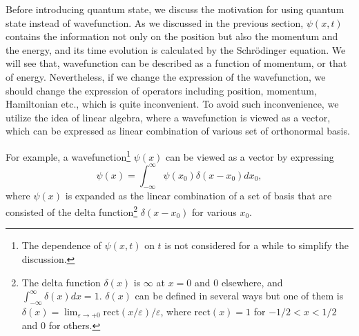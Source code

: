 \documentclass{book}
\begin{document}
Before introducing quantum state, we discuss the motivation for using quantum state instead of wavefunction. As we discussed in the previous section, $\psi(x,t)$ contains the information not only on the position but also the momentum and the energy, and its time evolution is calculated by the Schr\"odinger equation. We will see that, wavefunction can be described as a function of momentum, or that of energy. Nevertheless, if we change the expression of the wavefunction, we should change the expression of operators including position, momentum, Hamiltonian etc., which is quite inconvenient. To avoid such inconvenience, we utilize the idea of linear algebra, where a wavefunction is viewed as a vector, which can be expressed as linear combination of various set of orthonormal basis.


For example, a wavefunction\footnote{The dependence of $\psi(x,t)$ on $t$ is not considered for a while to simplify the discussion.} $\psi(x)$ can be viewed as a vector by expressing
\begin{equation}
  \psi(x) = \int_{-\infty}^{\infty}\psi(x_0)\delta(x-x_0)dx_0,
  \label{eq:delta_function_1}
\end{equation}
where $\psi(x)$ is expanded as the linear combination of a set of basis that are consisted of the delta function\footnote{The delta function $\delta(x)$ is $\infty$ at $x = 0$ and $0$ elsewhere, and $\int_{-\infty}^{\infty}\delta(x)dx = 1$. $\delta(x)$ can be defined in several ways but one of them is $\delta(x) = \lim_{\varepsilon \to +0} \mathrm{rect}(x/\varepsilon)/\varepsilon$, where  $\mathrm{rect}(x) = 1$ for $-1/2 < x < 1/2$ and 0 for others.}
 $\delta(x-x_0)$ for various $x_0$. 
\end{document}

